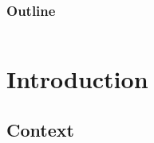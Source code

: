 \documentclass[10pt,table,dvipsnames,compress]{beamer}
\newif\ifplacelogo %
\begin{document}

\placelogotrue
\begin{frame}
  \frametitle{Outline}
  \begin{columns}[c]
    \begin{column}{0.5\textwidth}
      \tableofcontents[sections=1]
      \vspace{0.5cm}
      \tableofcontents[sections=2]
      \vspace{0.5cm}
      \tableofcontents[sections=3]
    \end{column}
    \begin{column}{0.5\textwidth}
        \tableofcontents[sections=4]
        \vspace{0.5cm}
        \tableofcontents[sections=5]
    \end{column}
  \end{columns}
\end{frame}
\placelogofalse

\section{Introduction}
\label{sec:orgeddd5fb}

\subsection{Context}
\label{sec:orga9952bc}
\end{document}
